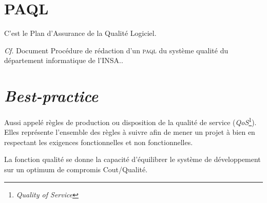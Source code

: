 \section{PAQL}
C'est le Plan d'Assurance de la Qualité Logiciel.

\textsl{Cf.} Document \og Procédure de rédaction d'un \textsc{paql} du système qualité du département informatique de l'INSA.\fg.

\section{\textsl{Best-practice}}
Aussi appelé règles de production ou disposition de la qualité de service (\textsl{QoS}\footnote{\textsl{Quality of Service}}). Elles représente l'ensemble des règles à suivre afin de mener un projet à bien en respectant les exigences fonctionnelles et non fonctionnelles.

La fonction qualité se donne la capacité d'équilibrer le système de développement sur un optimum de compromis Cout/Qualité.
